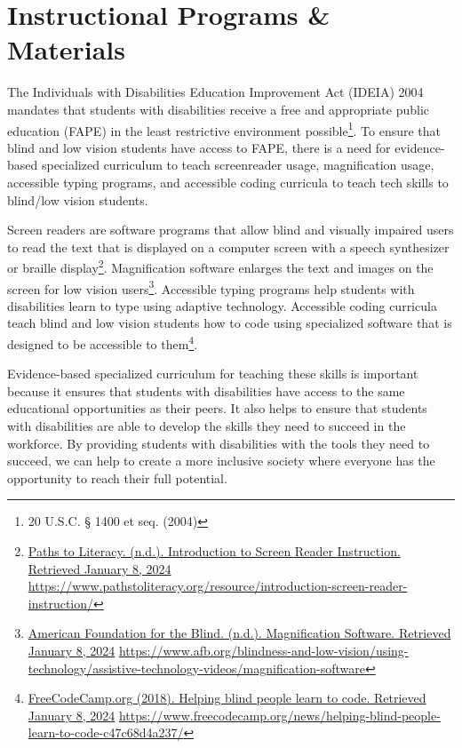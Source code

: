 \hypertarget{appx4}{}\chapter[\hfill\break\raggedright Instructional Programs \& Materials Materials]{Instructional Programs \& Materials}\label{appx4}
{\hfill\break\let\clearpage\relax\localtableofcontents}\newpage

The Individuals with Disabilities Education Improvement Act (IDEIA) 2004 mandates that students with disabilities receive a free and appropriate public education (FAPE) in the least restrictive environment possible\footnote{\raggedright 20 U.S.C. § 1400 et seq. (2004)}. To ensure that blind and low vision students have access to FAPE, there is a need for evidence-based specialized curriculum to teach screenreader usage, magnification usage, accessible typing programs, and accessible coding curricula to teach tech skills to blind/low vision students.

Screen readers are software programs that allow blind and visually impaired users to read the text that is displayed on a computer screen with a speech synthesizer or braille display\footnote{\raggedright \href{https://www.pathstoliteracy.org/resource/introduction-screen-reader-instruction/}{Paths to Literacy. (n.d.). Introduction to Screen Reader Instruction. Retrieved January 8, 2024} \break\url{https://www.pathstoliteracy.org/resource/introduction-screen-reader-instruction/}}. Magnification software enlarges the text and images on the screen for low vision users\footnote{\raggedright \href{https://www.afb.org/blindness-and-low-vision/using-technology/assistive-technology-videos/magnification-software}{American Foundation for the Blind. (n.d.). Magnification Software. Retrieved January 8, 2024} \url{https://www.afb.org/blindness-and-low-vision/using-technology/assistive-technology-videos/magnification-software}}. Accessible typing programs help students with disabilities learn to type using adaptive technology. Accessible coding curricula teach blind and low vision students how to code using specialized software that is designed to be accessible to them\footnote{\raggedright \href{https://www.freecodecamp.org/news/helping-blind-people-learn-to-code-c47c68d4a237/}{FreeCodeCamp.org (2018). Helping blind people learn to code. Retrieved January 8, 2024} \break\url{https://www.freecodecamp.org/news/helping-blind-people-learn-to-code-c47c68d4a237/}}.

Evidence-based specialized curriculum for teaching these skills is important because it ensures that students with disabilities have access to the same educational opportunities as their peers. It also helps to ensure that students with disabilities are able to develop the skills they need to succeed in the workforce. By providing students with disabilities with the tools they need to succeed, we can help to create a more inclusive society where everyone has the opportunity to reach their full potential.

